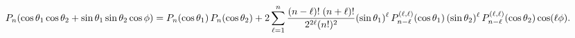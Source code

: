 \[\mathop{P_{n}\/}\nolimits\!\left(\mathop{\cos\/}\nolimits\theta_{1}\mathop{%
\cos\/}\nolimits\theta_{2}+\mathop{\sin\/}\nolimits\theta_{1}\mathop{\sin\/}%
\nolimits\theta_{2}\mathop{\cos\/}\nolimits\phi\right)={\mathop{P_{n}\/}%
\nolimits\!\left(\mathop{\cos\/}\nolimits\theta_{1}\right)\mathop{P_{n}\/}%
\nolimits\!\left(\mathop{\cos\/}\nolimits\theta_{2}\right)+2\sum_{\ell=1}^{n}%
\frac{(n-\ell)!\;(n+\ell)!}{2^{2\ell}(n!)^{2}}(\mathop{\sin\/}\nolimits\theta_%
{1})^{\ell}\mathop{P^{(\ell,\ell)}_{n-\ell}\/}\nolimits\!\left(\mathop{\cos\/}%
\nolimits\theta_{1}\right)(\mathop{\sin\/}\nolimits\theta_{2})^{\ell}\mathop{P%
^{(\ell,\ell)}_{n-\ell}\/}\nolimits\!\left(\mathop{\cos\/}\nolimits\theta_{2}%
\right)\mathop{\cos\/}\nolimits\!\left(\ell\phi\right)}.\]